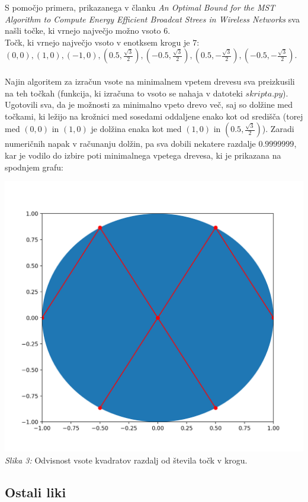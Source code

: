 \documentclass[a4paper]{report}
\begin{document}
S pomočjo primera, prikazanega v članku \textit{An Optimal Bound for the MST Algorithm to Compute Energy Efficient Broadcat Strees in Wireless Networks} sva našli točke, ki vrnejo največjo možno vsoto $6$. \\
Točk, ki vrnejo največjo vsoto v enotksem krogu je $7$: $(0,0), (1,0), (-1,0), (0.5, \frac{\sqrt{3}}{2}), (-0.5, \frac{\sqrt{3}}{2}), (0.5, -\frac{\sqrt{3}}{2}), (-0.5, -\frac{\sqrt{3}}{2})$. \\ \\
Najin algoritem za izračun vsote na minimalnem vpetem drevesu sva preizkusili na teh točkah (funkcija, ki izračuna to vsoto se nahaja v datoteki \colorbox{gray!10}{$skripta.py$}). Ugotovili sva, da je možnosti za minimalno vpeto drevo več, saj so dolžine med točkami, ki ležijo na krožnici med sosedami oddaljene enako kot od središča (torej med $(0,0)$ in $(1,0)$ je dolžina enaka kot med $(1,0)$ in $(0.5, \frac{\sqrt{3}}{2})$). Zaradi numeričnih napak v računanju dolžin, pa sva dobili nekatere razdalje $0.9999999$, kar je vodilo do izbire poti minimalnega vpetega drevesa, ki je prikazana na spodnjem grafu:
\begin{center}
\includegraphics[scale = 0.3]{krog_vsota6}\\ 
\scriptsize{\textit{Slika 3: }  Odvisnost vsote kvadratov razdalj od števila točk v krogu.}
\end{center}


\subsection{Ostali liki}
\end{document}
